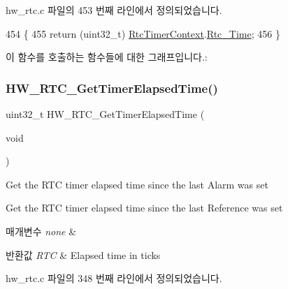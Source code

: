 hw\+\_\+rtc.\+c 파일의 453 번째 라인에서 정의되었습니다.


\begin{DoxyCode}
454 \{
455   \textcolor{keywordflow}{return} (uint32\_t) \mbox{\hyperlink{hw__rtc_8c_a0e042f0e024135713eeb5896d77a2356}{RtcTimerContext}}.\mbox{\hyperlink{struct_rtc_timer_context__t_a05f48439ba05c77e6271805cff79760f}{Rtc\_Time}};
456 \}
\end{DoxyCode}
이 함수를 호출하는 함수들에 대한 그래프입니다.\+:
\mbox{\label{group___lory_s_d_k___r_t_c___functions_ga7961116aa831950b62a413ecbbcfb02a}} 
\subsubsection{\texorpdfstring{H\+W\+\_\+\+R\+T\+C\+\_\+\+Get\+Timer\+Elapsed\+Time()}{HW\_RTC\_GetTimerElapsedTime()}}
{\footnotesize\ttfamily uint32\+\_\+t H\+W\+\_\+\+R\+T\+C\+\_\+\+Get\+Timer\+Elapsed\+Time (\begin{DoxyParamCaption}\item[{void}]{ }\end{DoxyParamCaption})}



Get the R\+TC timer elapsed time since the last Alarm was set 

Get the R\+TC timer elapsed time since the last Reference was set


\begin{DoxyParams}{매개변수}
{\em none} & \\
\hline
\end{DoxyParams}

\begin{DoxyRetVals}{반환값}
{\em R\+TC} & Elapsed time in ticks \\
\hline
\end{DoxyRetVals}


hw\+\_\+rtc.\+c 파일의 348 번째 라인에서 정의되었습니다.


